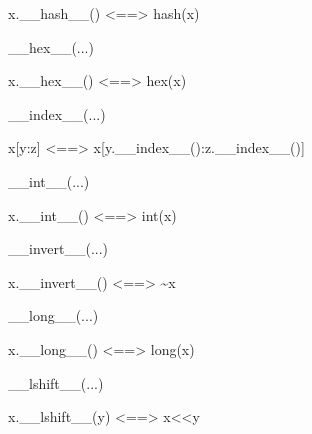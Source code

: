 \documentclass[letterpaper,10pt,english]{sphinxmanual}
\begin{document}
\begin{description}
\begin{description}
\begin{DUlineblock}{0em}
\item[]
\begin{DUlineblock}{\DUlineblockindent}
\item[] x.\_\_hash\_\_() \textless{}==\textgreater{} hash(x)
\item[] 
\end{DUlineblock}
\item[] \_\_hex\_\_(...)
\item[]
\begin{DUlineblock}{\DUlineblockindent}
\item[] x.\_\_hex\_\_() \textless{}==\textgreater{} hex(x)
\item[] 
\end{DUlineblock}
\item[] \_\_index\_\_(...)
\item[]
\begin{DUlineblock}{\DUlineblockindent}
\item[] x{[}y:z{]} \textless{}==\textgreater{} x{[}y.\_\_index\_\_():z.\_\_index\_\_(){]}
\item[] 
\end{DUlineblock}
\item[] \_\_int\_\_(...)
\item[]
\begin{DUlineblock}{\DUlineblockindent}
\item[] x.\_\_int\_\_() \textless{}==\textgreater{} int(x)
\item[] 
\end{DUlineblock}
\item[] \_\_invert\_\_(...)
\item[]
\begin{DUlineblock}{\DUlineblockindent}
\item[] x.\_\_invert\_\_() \textless{}==\textgreater{} \textasciitilde{}x
\item[] 
\end{DUlineblock}
\item[] \_\_long\_\_(...)
\item[]
\begin{DUlineblock}{\DUlineblockindent}
\item[] x.\_\_long\_\_() \textless{}==\textgreater{} long(x)
\item[] 
\end{DUlineblock}
\item[] \_\_lshift\_\_(...)
\item[]
\begin{DUlineblock}{\DUlineblockindent}
\item[] x.\_\_lshift\_\_(y) \textless{}==\textgreater{} x\textless{}\textless{}y

\end{DUlineblock}
\end{DUlineblock}
\end{description}
\end{description}
\end{document}

